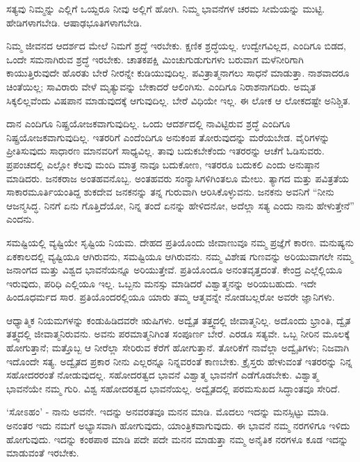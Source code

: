 ಸತ್ಯವು ನಿಮ್ಮನ್ನು ಎಲ್ಲಿಗೆ ಒಯ್ದರೂ ನೀವು ಅಲ್ಲಿಗೆ ಹೋಗಿ. ನಿಮ್ಮ ಭಾವನೆಗಳ ಚರಮ ಸೀಮೆಯನ್ನು ಮುಟ್ಟಿ. ಹೇಡಿಗಳಾಗಬೇಡಿ. ಆಷಾಢಭೂತಿಗಳಾಗಬೇಡಿ.

ನಿಮ್ಮ ಜೀವನದ ಆದರ್ಶದ ಮೇಲೆ ನಿಮಗೆ ಶ್ರದ್ಧೆ ಇರಬೇಕು. ಕ್ಷಣಿಕ ಶ್ರದ್ಧೆಯಲ್ಲ. ಉದ್ವೇಗವಿಲ್ಲದ, ಎಂದಿಗೂ ಬಿಡದ, ಒಂದೇ ಸಮನಾಗಿರುವ ಶ್ರದ್ಧೆ ಇರಬೇಕು. ಚಾತಕಪಕ್ಷಿ ಮಿಂಚುಗುಡುಗುಗಳು ಬರುವಾಗ ಮಳೆನೀರಿಗಾಗಿ ಕಾಯುತ್ತಿರುವುದೇ ಹೊರತು ಬೇರೆ ನೀರನ್ನೇ ಕುಡಿಯುವುದಿಲ್ಲ. ಪವಿತ್ರಾತ್ಮನಾಗಲು ಸಾಧನೆ ಮಾಡುತ್ತಾ. ನಾಶವಾದರೂ ಚಿಂತೆಯಿಲ್ಲ; ಸಾವಿರಾರು ವೇಳೆ ಮೃತ್ಯುವನ್ನು ಬೇಕಾದರೆ ಆಲಿಂಗಿಸು. ಎಂದಿಗೂ ನಿರಾಶನಾಗದಿರು. ಅಮೃತ ಸಿಕ್ಕಲಿಲ್ಲವೆಂದು ವಿಷಪಾನ ಮಾಡುವುದಕ್ಕೆ ಆಗುವುದಿಲ್ಲ. ಬೇರೆ ವಿಧಿಯೇ ಇಲ್ಲ. ಈ ಲೋಕ ಆ ಲೋಕದಷ್ಟೇ ಅನಿಶ್ಚಿತ.

ದಾನ ಎಂದಿಗೂ ನಿಷ್ಪ್ರಯೋಜಕವಾಗುವುದಿಲ್ಲ. ಒಂದು ಆದರ್ಶದಲ್ಲಿ ನಾವಿಟ್ಟಿರುವ ಶ್ರದ್ಧೆ ಎಂದಿಗೂ ನಿಷ್ಪ್ರಯೋಜಕವಾಗುವುದಿಲ್ಲ. ಇತರರಿಗೆ ಎಂದೆಂದಿಗೂ ಅನುಕಂಪ ತೋರುವುದನ್ನು ಮರೆಯಬೇಡ. ವೈರಿಗಳನ್ನು ಪ್ರೀತಿಸುವುದು ಸಾಧಾರಣ ಮಾನವರಿಗೆ ಸಾಧ್ಯವಿಲ್ಲ. ತಾವು ಬದುಕಬೇಕೆಂದು ಇತರರನ್ನು ಆಚೆಗೆ ಓಡಿಸುವರು. ಪ್ರಪಂಚದಲ್ಲಿ ಎಲ್ಲೋ ಕೆಲವು ಮಂದಿ ಮಾತ್ರ ನಾವೂ ಬದುಕೋಣ, ಇತರರೂ ಬದುಕಲಿ ಎಂದು ಅನುಷ್ಠಾನ ಮಾಡಿದರು. ಜನಕರಾಜ ಅಂತಹವನೊಬ್ಬ. ಅಂತಹವರು ಸಂನ್ಯಾಸಿಗಳಿಗಿಂತಲೂ ಮೇಲು. ತ್ಯಾಗದ ಮತ್ತು ಪವಿತ್ರತೆಯ ಸಾಕಾರಮೂರ್ತಿಯಂತಿದ್ದ ಶುಕದೇವ ಜನಕನನ್ನು ತನ್ನ ಗುರುವಾಗಿ ಆರಿಸಿಕೊಳ್ಳುವನು. ಜನಕನು ಅವನಿಗೆ “ನೀನು ಆಜನ್ಮಸಿದ್ಧ. ನಿನಗೆ ಏನು ಗೊತ್ತಿದೆಯೋ, ನಿನ್ನ ತಂದೆ ಏನನ್ನು ಹೇಳಿದನೋ, ಅದೆಲ್ಲಾ ಸತ್ಯ ಎಂದು ನಾನು ಹೇಳುತ್ತೇನೆ” ಎಂದನು.

ಸಮಷ್ಟಿಯಲ್ಲಿ ವ್ಯಷ್ಟಿಯೇ ಸೃಷ್ಟಿಯ ನಿಯಮ. ದೇಹದ ಪ್ರತಿಯೊಂದು ಜೀವಾಣುವೂ  ನಮ್ಮ ಪ್ರಜ್ಞೆಗೆ ಕಾರಣ. ಮನುಷ್ಯನು ಏಕಕಾಲದಲ್ಲಿ ವ್ಯಷ್ಟಿಯೂ ಆಗಿರುವನು, ಸಮಷ್ಟಿಯೂ ಆಗಿರುವನು. ನಮ್ಮ ವಿಶೇಷ ಗುಣವನ್ನು ಅರಿಯುವಾಗಲೇ ನಮ್ಮ ಜನಾಂಗದ ಮತ್ತು ವಿಶ್ವದ ಭಾವನೆಯನ್ನೂ ಅರಿಯುತ್ತೇವೆ. ಪ್ರತಿಯೊಂದೂ ಅನಂತವೃತ್ತದಂತೆ. ಕೇಂದ್ರ ಎಲ್ಲೆಲ್ಲಿಯೂ ಇರುವುದು, ಪರಿಧಿ ಎಲ್ಲಿಯೂ ಇಲ್ಲ. ಒಬ್ಬನು ಮನಸ್ಸು ಮಾಡಿದರೆ ವಿಶ್ವಾತ್ಮನನ್ನು ಅರಿಯಬಹುದು. ಇದೇ ಹಿಂದೂಧರ್ಮದ ಸಾರ. ಪ್ರತಿಯೊಂದರಲ್ಲಿಯೂ ಯಾರು ತಮ್ಮ ಆತ್ಮವನ್ನೇ ನೋಡಬಲ್ಲರೋ ಅವರೇ ಜ್ಞಾನಿಗಳು.

ಆಧ್ಯಾತ್ಮಿಕ ನಿಯಮಗಳನ್ನು ಕಂಡುಹಿಡಿದವರೇ ಋಷಿಗಳು. ಅದ್ವೈತ ತತ್ತ್ವದಲ್ಲಿ ಜೀವಾತ್ಮನಿಲ್ಲ. ಅದೊಂದು ಭ್ರಾಂತಿ, ದ್ವೈತ ತತ್ತ್ವದಲ್ಲಿ ಜೀವಾತ್ಮನಿರುವನು. ಅವನು ಪರಮಾತ್ಮನಿಗಿಂತ ಸಂಪೂರ್ಣ ಬೇರೆ. ಎರಡೂ ಸತ್ಯವೇ. ಒಬ್ಬ ನೀರಿನ ಮೂಲಕ್ಕೆ ಹೋಗುತ್ತಾನೆ; ಮತ್ತೊಬ್ಬ ಆ ನೀರೆಲ್ಲಾ ಸೇರಿರುವ ಕೆರೆಗೆ ಹೋಗುತ್ತಾನೆ. ತೋರಿಕೆಗೆ ನಾವೆಲ್ಲಾ ಅದ್ವೈತಿಗಳು; ನಿಜವಾಗಿ ಇದೊಂದೇ ಸತ್ಯ. ಅದ್ವೈತದ ಪ್ರಕಾರ ನೀನು ಎಲ್ಲರನ್ನೂ ನಿನ್ನವರಂತೆ ಕಾಣಬೇಕು. ಕ್ರೈಸ್ತರು ಹೇಳುವಂತೆ ಇತರರನ್ನು ನಿನ್ನ ಸಹೋದರರಂತೆ ನೋಡುವುದಲ್ಲ. ಸಹೋದರತ್ವದ ಭಾವನೆ ವಿಶ್ವಾತ್ಮ ಭಾವನೆಗೆ ಎಡೆಗೊಡಬೇಕು. ವಿಶ್ವಾತ್ಮ ಭಾವನೆಯೇ ನಮ್ಮ ಗುರಿ. ವಿಶ್ವ ಸಹೋದರತ್ವದ ಭಾವನೆಯಲ್ಲ. ಅದ್ವೈತದಲ್ಲಿ ಪರಮಸುಖದ ಸಿದ್ಧಾಂತವೂ ಸೇರಿದೆ.

‘ಸೋಽಹಂ’ - ನಾನು ಅವನೇ. ಇದನ್ನು ಅನವರತವೂ ಮನನ ಮಾಡಿ. ಮೊದಲು ಇದನ್ನು ಮನಸ್ಸಿಟ್ಟು ಮಾಡಿ. ಅನಂತರ ಇದು ನಮಗೆ ಅಭ್ಯಾಸವಾಗಿ ಹೋಗುವುದು, ಯಾಂತ್ರಿಕವಾಗುವುದು. ಈ ಭಾವನೆ ನಮ್ಮ ನರಗಳಿಗೂ ಇಳಿದು ಹೋಗುವುದು. ಇದನ್ನು ಕಂಠಪಾಠ ಮಾಡಿ ಪದೇ ಪದೇ ಮನನ ಮಾಡುತ್ತಾ ನಮ್ಮ ಅನೈತಿಕ ನರಗಳೂ ಕೂಡ ಇದನ್ನು ಮಾಡುವಂತೆ ಇರಬೇಕು.

